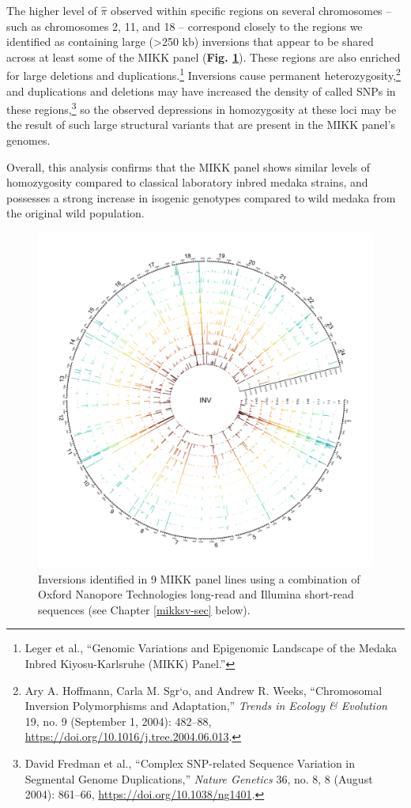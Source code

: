 \documentclass[
]{book}
\begin{document}
The higher level of \(\hat{\pi}\) observed within specific regions on several chromosomes -- such as chromosomes 2, 11, and 18 -- correspond closely to the regions we identified as containing large (\textgreater250 kb) inversions that appear to be shared across at least some of the MIKK panel (\textbf{Fig. \ref{fig:SVInvs}}). These regions are also enriched for large deletions and duplications.\footnote{Leger et al., {``Genomic Variations and Epigenomic Landscape of the {Medaka Inbred Kiyosu-Karlsruhe} ({MIKK}) Panel.''}} Inversions cause permanent heterozygosity,\footnote{Ary A. Hoffmann, Carla M. Sgr`o, and Andrew R. Weeks, {``Chromosomal Inversion Polymorphisms and Adaptation,''} \emph{Trends in Ecology \& Evolution} 19, no. 9 (September 1, 2004): 482--88, \url{https://doi.org/10.1016/j.tree.2004.06.013}.} and duplications and deletions may have increased the density of called SNPs in these regions,\footnote{David Fredman et al., {``Complex {SNP-related} Sequence Variation in Segmental Genome Duplications,''} \emph{Nature Genetics} 36, no. 8, 8 (August 2004): 861--66, \url{https://doi.org/10.1038/ng1401}.} so the observed depressions in homozygosity at these loci may be the result of such large structural variants that are present in the MIKK panel's genomes.

Overall, this analysis confirms that the MIKK panel shows similar levels of homozygosity compared to classical laboratory inbred medaka strains, and possesses a strong increase in isogenic genotypes compared to wild medaka from the original wild population.



\begin{figure}
\includegraphics[width=1\linewidth]{figs/mikk_genome/20210224_sv_invs_lines} \caption{Inversions identified in 9 MIKK panel lines using a combination of Oxford Nanopore Technologies long-read and Illumina short-read sequences (see Chapter \ref{mikksv-sec} below).}\label{fig:SVInvs}
\end{figure}
\end{document}
